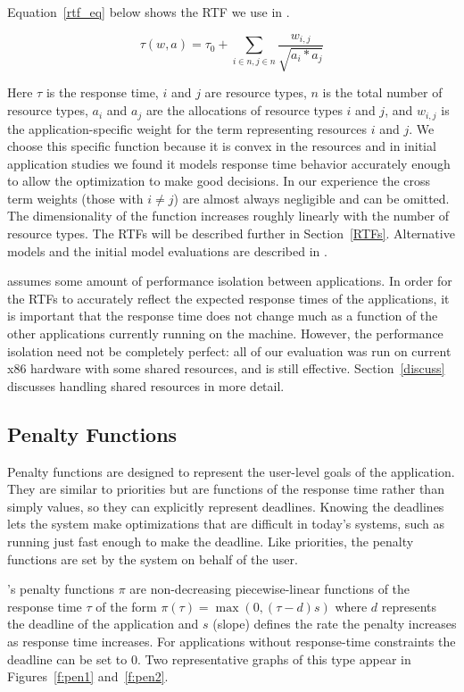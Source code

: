 Equation~\ref{rtf_eq} below shows the RTF we use in \pacora.

\begin{equation}\label{rtf_eq}
\tau(w,a) = \tau_0 + \sum_{i\in n,j\in n}{\frac{w_{i,j}}{\sqrt{a_i * a_j}}}
\end{equation}

Here $\tau$ is the response time, $i$ and $j$ are
resource types, $n$ is the total number of resource types,
$a_{i}$ and $a_{j}$ are the allocations of resource types $i$
and $j$, and $w_{i,j}$ is the application-specific weight for
the term representing resources $i$ and $j$.
We choose this specific function because it is convex in the resources and in initial application studies
we found it models response time behavior accurately enough to allow the optimization to make good decisions.
In our experience the cross term weights (those with $i\neq j$) are almost always negligible and can be omitted.
The dimensionality of the function increases roughly linearly with the number of resource types.
The RTFs will be described further in Section~\ref{RTFs}.
Alternative models and the initial model evaluations are described in
\cite{pacora_tr}.


\pacora assumes some amount of performance isolation between
applications.  In order for the RTFs to accurately reflect the
expected response times of the applications, it is important that the
response time does not change much as a function of the other
applications currently running on the machine.  However, the
performance isolation need not be completely perfect: all of our
evaluation was run on current x86 hardware with some shared resources,
and \pacora is still effective. Section~\ref{discuss} discusses
handling shared resources in more detail.

\subsection{Penalty Functions}
Penalty functions are designed to represent the user-level goals of
the application. They are similar to priorities but are functions of
the response time rather than simply values, so they can explicitly
represent deadlines.  Knowing the deadlines lets the system make
optimizations that are difficult in today's systems, such as running
just fast enough to make the deadline. Like priorities, the penalty
functions are set by the system on behalf of the user.

\pacora's penalty functions $\pi$ are non-decreasing piecewise-linear
functions of the response time $\tau$ of the form $\pi(\tau) = \max(0, (\tau - d)s)$
where $d$ represents the deadline of the application and $s$ (slope)
defines the rate the penalty increases as response time increases. For
applications without response-time constraints the deadline can be set
to $0$. Two representative graphs of this type appear in
Figures~\ref{f:pen1} and~\ref{f:pen2}.

